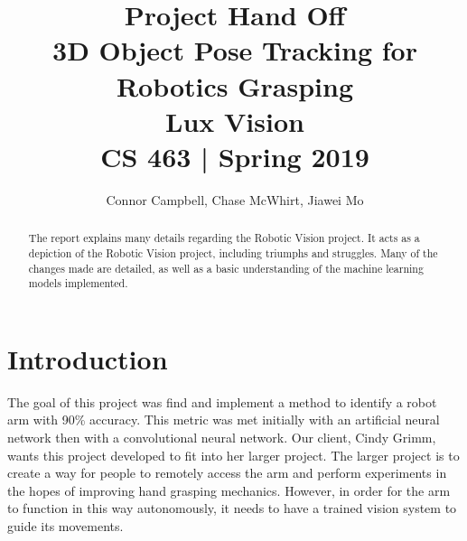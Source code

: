 \documentclass[10pt,journal,compsoc, draftclsnofoot,onecolumn]{IEEEtran}
\begin{document}
\title{Project Hand Off
    \\3D Object Pose Tracking for Robotics Grasping
    \\Lux Vision
    \\CS 463 | Spring 2019}
\author{Connor Campbell, Chase McWhirt, Jiawei Mo}

\maketitle

\begin{abstract}
The report explains many details regarding the Robotic Vision project.
It acts as a depiction of the Robotic Vision project, including triumphs and struggles.
Many of the changes made are detailed, as well as a basic understanding of the machine learning models implemented.

\end{abstract}

\IEEEdisplaynontitleabstractindextext
\IEEEpeerreviewmaketitle

\newpage
\tableofcontents

\newpage
\section{Introduction}

\noindent
The goal of this project was find and implement a method to identify a robot arm with 90\% accuracy.
This metric was met initially with an artificial neural network then with a convolutional neural network.
Our client, Cindy Grimm, wants this project developed to fit into her larger project.
The larger project is to create a way for people to remotely access the arm and perform experiments in the hopes of improving hand grasping mechanics.
However, in order for the arm to function in this way autonomously, it needs to have a trained vision system to guide its movements. \\
\end{document}
